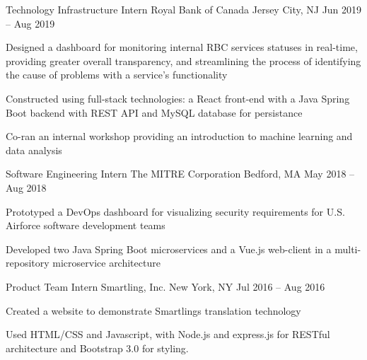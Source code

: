 

\begin{cventries}

  \cventry
  {Technology Infrastructure Intern}
  {Royal Bank of Canada}
  {Jersey City, NJ}
  {Jun 2019 -- Aug 2019}
  {
    \begin{cvitems}
      \item {Designed a dashboard for monitoring internal RBC services\textquotesingle{} statuses in real-time, providing greater overall transparency, and streamlining the process of identifying the cause of problems with a service's functionality}
      \item {Constructed using full-stack technologies: a React front-end with a Java Spring Boot backend with REST API and MySQL database for persistance}
      \item {Co-ran an internal workshop providing an introduction to machine learning and data analysis}
    \end{cvitems}
  }


  \cventry
  {Software Engineering Intern}
  {The MITRE Corporation}
  {Bedford, MA}
  {May 2018 -- Aug 2018}
  {
    \begin{cvitems}
      \item {Prototyped a DevOps dashboard for visualizing security requirements for U.S. Airforce software development teams}
      \item {Developed two Java Spring Boot microservices and a Vue.js web-client in a multi-repository microservice architecture}
    \end{cvitems}
  }


  \cventry
  {Product Team Intern}
  {Smartling, Inc.}
  {New York, NY}
  {Jul 2016 -- Aug 2016}
  {
    \begin{cvitems}
      \item Created a website to demonstrate Smartling\textquotesingle{}s translation technology
      \item Used HTML/CSS and Javascript, with Node.js and express.js for RESTful architecture and Bootstrap 3.0 for styling.
    \end{cvitems}
  }


\end{cventries}